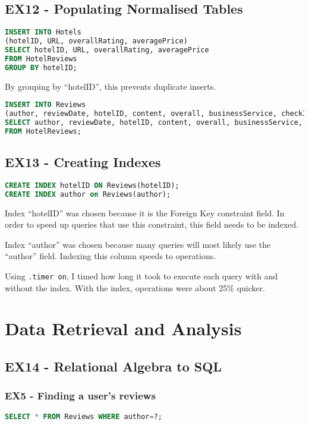 \documentclass[a4paper]{article}
\begin{document}
%
%
\subsection{EX12 - Populating Normalised Tables} 
\begin{lstlisting}[language=SQL, style=default]
INSERT INTO Hotels
(hotelID, URL, overallRating, averagePrice)
SELECT hotelID, URL, overallRating, averagePrice
FROM HotelReviews
GROUP BY hotelID;
\end{lstlisting}
By grouping by ``hotelID'', this prevents duplicate inserts.

\begin{lstlisting}[language=SQL, style=default]
INSERT INTO Reviews
(author, reviewDate, hotelID, content, overall, businessService, checkIn, cleanliness, location, rooms, service, value, noReaders, noHelpful)
SELECT author, reviewDate, hotelID, content, overall, businessService, checkIn, cleanliness, location, rooms, service, value, noReaders, noHelpful
FROM HotelReviews;
\end{lstlisting}

%
%
\subsection{EX13 - Creating Indexes}
\begin{lstlisting}[language=SQL, style=default]
CREATE INDEX hotelID ON Reviews(hotelID);
CREATE INDEX author on Reviews(author);
\end{lstlisting}
Index ``hotelID'' was chosen because it is the Foreign Key constraint field.
In order to speed up queries that use this constraint, this field needs to be indexed.

Index ``author'' was chosen because many queries will most likely use the ``author'' field.
Indexing this column speeds to operations.

Using \texttt{.timer on}, I timed how long it took to execute each query with and without the index.
With the index, operations were about 25\% quicker.

\section{Data Retrieval and Analysis}

%
%
\subsection{EX14 - Relational Algebra to SQL}
\subsubsection{EX5 - Finding a user's reviews}
\begin{lstlisting}[language=SQL, style=default]
SELECT * FROM Reviews WHERE author=?;
\end{lstlisting}
\end{document}
